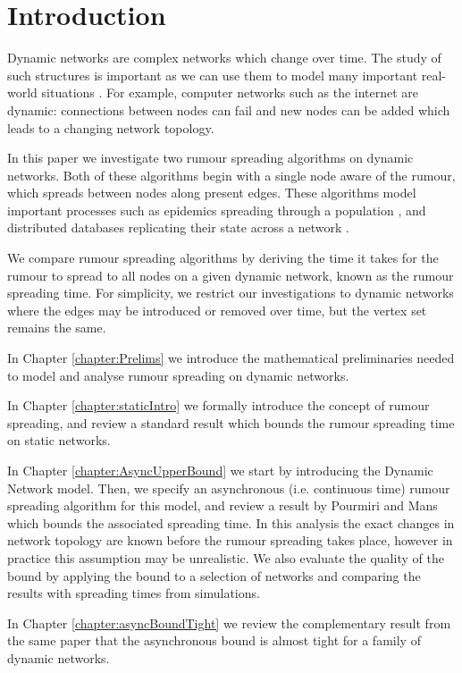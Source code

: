 \chapter{Introduction}

Dynamic networks are complex networks which change over time. The study of such structures is important as we can use them to model many important real-world situations \cite{motivation}. For example, computer networks such as the internet are dynamic: connections between nodes can fail and new nodes can be added which leads to a changing network topology. 

In this paper we investigate two rumour spreading algorithms on dynamic networks. Both of these algorithms begin with a single node aware of the rumour, which spreads between nodes along present edges. These algorithms model important processes such as epidemics spreading through a population \cite{staticsWellUnderstood}, and distributed databases replicating their state across a network \cite{stateReplication}. 

We compare rumour spreading algorithms by deriving the time it takes for the rumour to spread to all nodes on a given dynamic network, known as the rumour spreading time. 
For simplicity, we restrict our investigations to dynamic networks where the edges may be introduced or removed over time, but the vertex set remains the same. 

In Chapter \ref{chapter:Prelims} we introduce the mathematical preliminaries needed to model and analyse rumour spreading on dynamic networks.

In Chapter \ref{chapter:staticIntro} we formally introduce the concept of rumour spreading, and review a standard result which bounds the rumour spreading time on static networks.

In Chapter \ref{chapter:AsyncUpperBound} we start by introducing the Dynamic Network model. Then, we specify an asynchronous (i.e. continuous time) rumour spreading algorithm for this model, and review a result by Pourmiri and Mans \cite{asyncPaper} which bounds the associated spreading time. In this analysis the exact changes in network topology are known before the rumour spreading takes place, however in practice this assumption may be unrealistic. We also evaluate the quality of the bound by applying the bound to a selection of networks and comparing the results with spreading times from simulations.

In Chapter \ref{chapter:asyncBoundTight} we review the complementary result from the same paper \cite{asyncPaper} that the asynchronous bound is almost tight for a family of dynamic networks.

